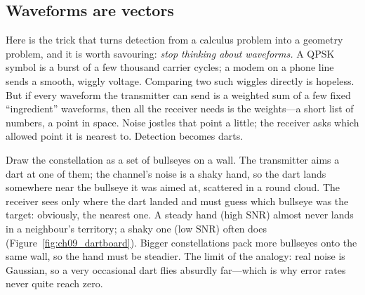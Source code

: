 \subsection{Waveforms are vectors}

Here is the trick that turns detection from a calculus problem into a geometry problem, and it
is worth savouring: \emph{stop thinking about waveforms.} A QPSK symbol is a burst of a few
thousand carrier cycles; a modem on a phone line sends a smooth, wiggly voltage. Comparing two
such wiggles directly is hopeless. But if every waveform the transmitter can send is a weighted
sum of a few fixed ``ingredient'' waveforms, then all the receiver needs is the weights---a short
list of numbers, a point in space. Noise jostles that point a little; the receiver asks which
allowed point it is nearest to. Detection becomes darts.

\begin{analogy}
Draw the constellation as a set of bullseyes on a wall. The transmitter aims a dart at one of
them; the channel's noise is a shaky hand, so the dart lands somewhere near the bullseye it was
aimed at, scattered in a round cloud. The receiver sees only where the dart landed and must guess
which bullseye was the target: obviously, the nearest one. A steady hand (high SNR) almost never
lands in a neighbour's territory; a shaky one (low SNR) often does
(Figure~\ref{fig:ch09_dartboard}). Bigger constellations pack more bullseyes onto the same wall,
so the hand must be steadier. The limit of the analogy: real noise is Gaussian, so a very
occasional dart flies absurdly far---which is why error rates never quite reach zero.
\end{analogy}


